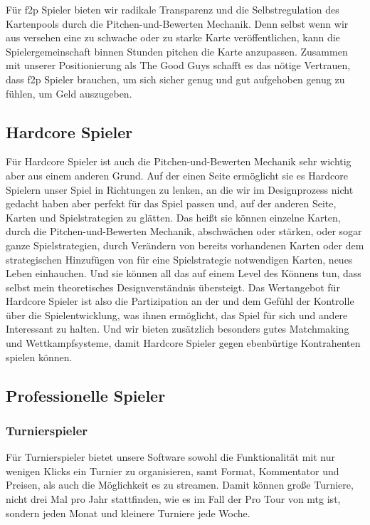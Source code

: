 \documentclass[fontsize=11, a4aper]{scrartcl}
\begin{document}
Für \ac{f2p} Spieler bieten wir radikale Transparenz und die Selbstregulation des Kartenpools durch die Pitchen-und-Bewerten Mechanik. Denn selbst wenn wir aus versehen eine zu schwache oder zu starke Karte veröffentlichen, kann die Spielergemeinschaft binnen Stunden pitchen die Karte anzupassen. Zusammen mit unserer Positionierung als \glqq The Good Guys\grqq{} schafft es das nötige Vertrauen, dass \ac{f2p} Spieler brauchen, um sich sicher genug und gut aufgehoben genug zu fühlen, um Geld auszugeben.

\subsection{Hardcore Spieler} \label{subsec:Wertangebot:Hardcore_Spieler}

Für Hardcore Spieler ist auch die Pitchen-und-Bewerten Mechanik sehr wichtig aber aus einem anderen Grund. Auf der einen Seite ermöglicht sie es Hardcore Spielern unser Spiel in Richtungen zu lenken, an die wir im Designprozess nicht gedacht haben aber perfekt für das Spiel passen und, auf der anderen Seite, Karten und Spielstrategien zu glätten. Das heißt sie können einzelne Karten, durch die Pitchen-und-Bewerten Mechanik, abschwächen oder stärken, oder sogar ganze Spielstrategien, durch Verändern von bereits vorhandenen Karten oder dem strategischen Hinzufügen von für eine Spielstrategie notwendigen Karten, neues Leben einhauchen. Und sie können all das auf einem Level des Könnens tun, dass selbst mein theoretisches Designverständnis übersteigt. Das Wertangebot für Hardcore Spieler ist also die Partizipation an der und dem Gefühl der Kontrolle über die Spielentwicklung, was ihnen ermöglicht, das Spiel für sich und andere Interessant zu halten. Und wir bieten zusätzlich besonders gutes Matchmaking und Wettkampfsysteme, damit Hardcore Spieler gegen ebenbürtige Kontrahenten spielen können. 

\subsection{Professionelle Spieler} \label{subsec:Wertangebpot:Professionelle_Spieler}

\subsubsection{Turnierspieler} \label{subsubsec:Wertangebot:Turnierspieler}

Für Turnierspieler bietet unsere Software sowohl die Funktionalität mit nur wenigen Klicks ein Turnier zu organisieren, samt Format, Kommentator und Preisen, als auch die Möglichkeit es zu streamen. Damit können große Turniere, nicht drei Mal pro Jahr stattfinden, wie es im Fall der \glqq Pro Tour\grqq{} von \ac{mtg} ist, sondern jeden Monat und kleinere Turniere jede Woche.
\end{document}
